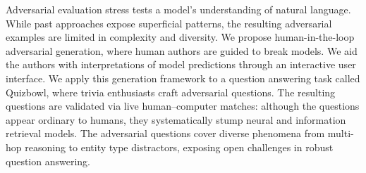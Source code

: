 Adversarial evaluation stress tests a model's understanding of natural language. While past approaches expose superficial patterns, the resulting adversarial examples are limited in complexity and diversity. We propose human-in-the-loop adversarial generation, where human authors are guided to break models. We aid the authors with interpretations of model predictions through an interactive user interface. We apply this generation framework to a question answering task called Quizbowl, where trivia enthusiasts craft adversarial questions. The resulting questions are validated via live human--computer matches: although the questions appear ordinary to humans, they systematically stump neural and information retrieval models. The adversarial questions cover diverse phenomena from multi-hop reasoning to entity type distractors, exposing open challenges in robust question answering.